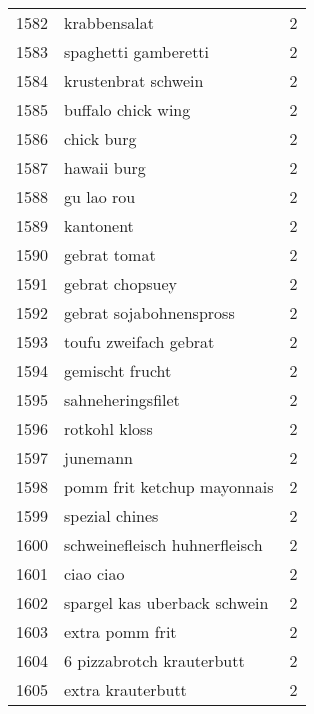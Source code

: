 \begin{tabular}{llr}
1582 &                                       krabbensalat &      2 \\
1583 &                               spaghetti gamberetti &      2 \\
1584 &                                krustenbrat schwein &      2 \\
1585 &                                 buffalo chick wing &      2 \\
1586 &                                         chick burg &      2 \\
1587 &                                        hawaii burg &      2 \\
1588 &                                         gu lao rou &      2 \\
1589 &                                          kantonent &      2 \\
1590 &                                       gebrat tomat &      2 \\
1591 &                                    gebrat chopsuey &      2 \\
1592 &                            gebrat sojabohnenspross &      2 \\
1593 &                              toufu zweifach gebrat &      2 \\
1594 &                                    gemischt frucht &      2 \\
1595 &                                  sahneheringsfilet &      2 \\
1596 &                                      rotkohl kloss &      2 \\
1597 &                                           junemann &      2 \\
1598 &                        pomm frit ketchup mayonnais &      2 \\
1599 &                                     spezial chines &      2 \\
1600 &                      schweinefleisch huhnerfleisch &      2 \\
1601 &                                          ciao ciao &      2 \\
1602 &                       spargel kas uberback schwein &      2 \\
1603 &                                    extra pomm frit &      2 \\
1604 &                          6 pizzabrotch krauterbutt &      2 \\
1605 &                                  extra krauterbutt &      2 \\

\end{tabular}
